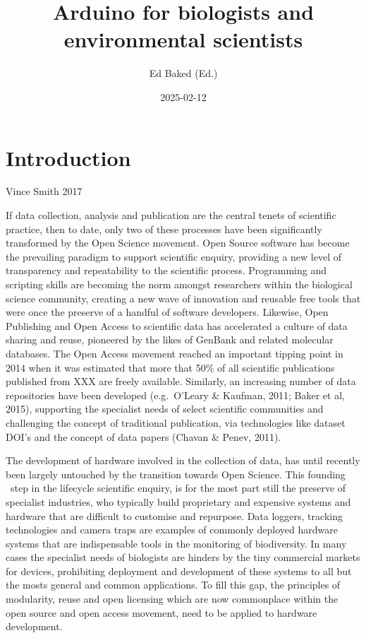 \documentclass[
]{book}
\title{Arduino for biologists and environmental scientists}
\author{Ed Baked (Ed.)}
\date{2025-02-12}
\begin{document}
\maketitle

{
\setcounter{tocdepth}{1}
\tableofcontents
}
\chapter{Introduction}\label{introduction}

Vince Smith 2017

If data collection, analysis and publication are the central tenets of scientific practice, then to date, only two of these processes have been significantly transformed by the Open Science movement. Open Source software has become the prevailing paradigm to support scientific enquiry, providing a new level of transparency and repeatability to the scientific process. Programming and scripting skills are becoming the norm amongst researchers within the biological science community, creating a new wave of innovation and reusable free tools that were once the preserve of a handful of software developers. Likewise, Open Publishing and Open Access to scientific data has accelerated a culture of data sharing and reuse, pioneered by the likes of GenBank and related molecular databases. The Open Access movement reached an important tipping point in 2014 when it was estimated that more that 50\% of all scientific publications published from XXX are freely available. Similarly, an increasing number of data repositories have been developed (e.g.~O'Leary \& Kaufman, 2011; Baker et al, 2015), supporting the specialist needs of select scientific communities and challenging the concept of traditional publication, via technologies like dataset DOI's and the concept of data papers (Chavan \& Penev, 2011).

The development of hardware involved in the collection of data, has until recently been largely untouched by the transition towards Open Science. This founding ~step in the lifecycle scientific enquiry, is for the most part still the preserve of specialist industries, who typically build proprietary and expensive systems and hardware that are difficult to customise and repurpose. Data loggers, tracking technologies and camera traps are examples of commonly deployed hardware systems that are indispensable tools in the monitoring of biodiversity. In many cases the specialist needs of biologists are hinders by the tiny commercial markets for devices, prohibiting deployment and development of these systems to all but the mosts general and common applications. To fill this gap, the principles of modularity, reuse and open licensing which are now commonplace within the open source and open access movement, need to be applied to hardware development.
\end{document}
